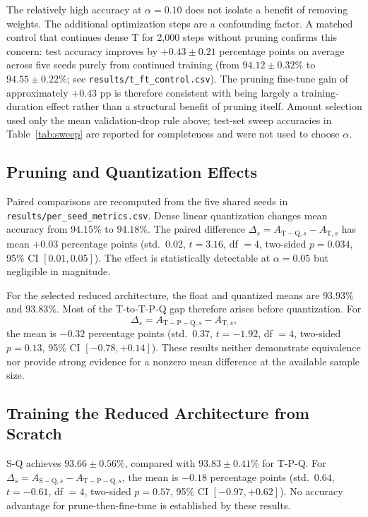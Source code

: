 \documentclass[journal]{IEEEtran}
\begin{document}
The relatively high accuracy at $\alpha=0.10$ does not isolate
a benefit of removing weights.
The additional optimization steps are a confounding factor.
A matched control that continues dense T for 2,000 steps without
pruning confirms this concern: test accuracy improves by
$+0.43\pm0.21$ percentage points on average across five seeds
purely from continued training
(from $94.12\pm0.32\%$ to $94.55\pm0.22\%$;
see \texttt{results/t\_ft\_control.csv}).
The pruning fine-tune gain of approximately $+0.43$ pp is therefore
consistent with being largely a training-duration effect rather than
a structural benefit of pruning itself.
Amount selection used only the mean validation-drop rule above;
test-set sweep accuracies in Table~\ref{tab:sweep} are reported
for completeness and were not used to choose $\alpha$.

\subsection{Pruning and Quantization Effects}

Paired comparisons are recomputed from the five shared seeds
in \texttt{results/per\_seed\_metrics.csv}.
Dense linear quantization changes mean accuracy from
$94.15\%$ to $94.18\%$.
The paired difference $\Delta_s=A_{\mathrm{T-Q},s}-A_{\mathrm{T},s}$
has mean $+0.03$ percentage points
(std.\ $0.02$, $t=3.16$, df $=4$, two-sided $p=0.034$,
95\% CI $[0.01,0.05]$).
The effect is statistically detectable at $\alpha=0.05$ but
negligible in magnitude.

For the selected reduced architecture, the float and quantized
means are $93.93\%$ and $93.83\%$.
Most of the T-to-T-P-Q gap therefore arises before quantization.
For
\begin{equation}
\Delta_s=A_{\mathrm{T-P-Q},s}-A_{\mathrm{T},s},
\end{equation}
the mean is $-0.32$ percentage points
(std.\ $0.37$, $t=-1.92$, df $=4$, two-sided $p=0.13$,
95\% CI $[-0.78,+0.14]$).
These results neither demonstrate equivalence nor provide strong
evidence for a nonzero mean difference at the available sample size.

\subsection{Training the Reduced Architecture from Scratch}

S-Q achieves $93.66\pm0.56\%$, compared with
$93.83\pm0.41\%$ for T-P-Q.
For $\Delta_s=A_{\mathrm{S-Q},s}-A_{\mathrm{T-P-Q},s}$,
the mean is $-0.18$ percentage points
(std.\ $0.64$, $t=-0.61$, df $=4$, two-sided $p=0.57$,
95\% CI $[-0.97,+0.62]$).
No accuracy advantage for prune-then-fine-tune is established by
these results.
\end{document}

